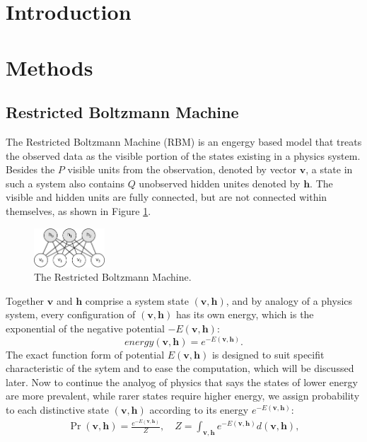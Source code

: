\documentclass[11pt]{article}
\newcommand{\vh}{\boldsymbol{h}}
\newcommand{\vv}{\boldsymbol{v}}
\begin{document}
\section*{Introduction}

\section*{Methods}

\subsection*{Restricted Boltzmann Machine}
The Restricted Boltzmann Machine (RBM) is an engergy based model that treats the observed data as the visible portion of the states existing in a physics system. Besides the $P$ visible units from the observation, denoted by vector $\vv$, a state in such a system also contains $Q$ unobserved hidden unites denoted by $\vh$. The visible and hidden units are fully connected, but are not connected within themselves, as shown in Figure \ref{fig:rbm}.
\begin{figure}[!htbp]
  \centering
  \includegraphics[width=100px]{img/rbm.png}
  \caption{The Restricted Boltzmann Machine.}\label{fig:rbm}
\end{figure}
Together $\vv$ and $\vh$ comprise a system state $(\vv, \vh)$, and by analogy of a physics system, every configuration of $(\vv, \vh)$ has its own energy, which is the exponential of the negative potential $-E(\vv, \vh)$:
\begin{equation*}
  energy(\vv, \vh) = e^{-E(\vv, \vh)}.
\end{equation*}
The exact function form of potential $E(\vv, \vh)$ is designed to suit specifit characteristic of the sytem and to ease the computation, which will be discussed later. Now to continue the analyog of physics that says the states of lower energy are more prevalent, while rarer states require higher energy, we assign probability to each distinctive state $(\vv, \vh)$ according to its energy $e^{-E(\vv, \vh)}$:
\begin{equation} \label{eq:prob0}
  \begin{split}
    \Pr(\vv, \vh) = \frac{e^{-E(\vv, \vh)}}{Z}, \quad Z = \int_{\vv,\vh}{e^{-E(\vv, \vh)}d(\vv, \vh)},
  \end{split}
\end{equation}
\end{document}
